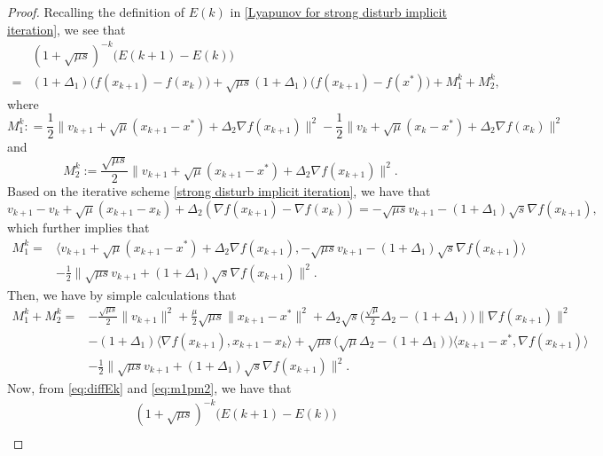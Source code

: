 \documentclass[11pt]{article}
\newcommand{\1}{\mathbf 1}
\numberwithin{equation}{section}
\begin{document}
\begin{proof}
{
Recalling the definition of $E(k)$ in \eqref{Lyapunov for strong disturb implicit iteration}, we see that
\begin{equation}\label{eq:diffEk}
    \begin{aligned}
    &(1+\sqrt{\mu s})^{-k}\big(E(k+1)-E(k) \big)\\
    =&(1+\Delta_1)\big(f(x_{k+1})-f(x_k)\big)+\sqrt{\mu s}(1+\Delta_1)\big(f(x_{k+1})-f(x^*)\big) + M_1^k + M_2^k,
\end{aligned}
\end{equation}
where 
\[M_1^k: = \frac{1}{2}\|v_{k+1}+\sqrt{\mu}(x_{k+1}-x^*)+\Delta_2\nabla f(x_{k+1})\|^2-\frac{1}{2}\|v_k+\sqrt{\mu}(x_k-x^*)+\Delta_2\nabla f(x_k)\|^2\]
and \[M_2^k := \frac{\sqrt{\mu s}}{2}\|v_{k+1}+\sqrt{\mu}(x_{k+1}-x^*)+\Delta_2\nabla f(x_{k+1})\|^2.\]
Based on the iterative scheme \eqref{strong disturb implicit iteration}, we have that
\begin{equation*}
    v_{k+1}-v_k+\sqrt{\mu}(x_{k+1}-x_k)+\Delta_2(\nabla f(x_{k+1})-\nabla f(x_k))=-\sqrt{\mu s}v_{k+1}-(1+\Delta_1)\sqrt{s}\nabla f(x_{k+1}),
\end{equation*}
which further implies that
\begin{align*}
    M_1^k
    =&\langle v_{k+1}+\sqrt{\mu}(x_{k+1}-x^*)+\Delta_2 \nabla f(x_{k+1}), -\sqrt{\mu s}v_{k+1}-(1+\Delta_1)\sqrt{s}\nabla f(x_{k+1}) \rangle\\
   & -\frac{1}{2}\|\sqrt{\mu s}v_{k+1}+(1+\Delta_1)\sqrt{s}\nabla f(x_{k+1}) \|^2.
\end{align*}
Then, we have by simple calculations that
\begin{equation}
    \label{eq:m1pm2}
    \begin{aligned}
    M_1^k + M_2^k = & -\frac{\sqrt{\mu s}}{2}\|v_{k+1}\|^2
            +\frac{\mu}{2}\sqrt{\mu s}\|x_{k+1}-x^*\|^2+\Delta_2\sqrt{s}\big(\frac{\sqrt{\mu}}{2}\Delta_2 -(1+\Delta_1)\big)\|\nabla f(x_{k+1})\|^2\\
            &-(1+\Delta_1)\langle \nabla f(x_{k+1}),x_{k+1}-x_{k}\rangle +\sqrt{\mu s}\big(\sqrt{\mu}\Delta_2-(1+\Delta_1)\big)\langle x_{k+1}-x^*, \nabla f(x_{k+1})\rangle \\
            & -\frac{1}{2}\|\sqrt{\mu s}v_{k+1}+(1+\Delta_1)\sqrt{s}\nabla f(x_{k+1})\|^2.
    \end{aligned}
\end{equation}
Now, from \eqref{eq:diffEk} and \eqref{eq:m1pm2}, we have that 
\begin{align*}
    &(1+\sqrt{\mu s})^{-k}\big(E(k+1)-E(k)\big)\\

\end{align*}}
\end{proof}
\end{document}
